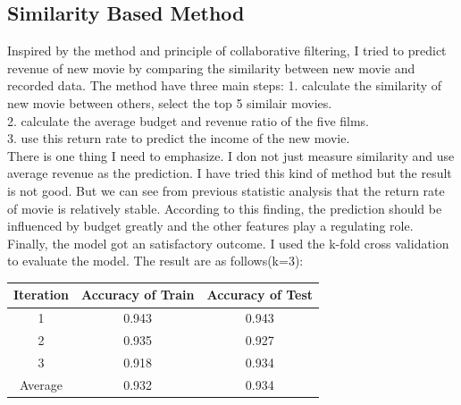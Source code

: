 \documentclass[UTF8]{article}
\begin{document}
\subsection{Similarity Based Method}
Inspired by the method and principle of collaborative filtering, I tried to predict revenue of new movie
by comparing the similarity between new movie and recorded data. The method have three main steps:
1. calculate the similarity of new movie between others, select the top 5 similair movies. \\
2. calculate the average budget and revenue ratio of the five films.\\
3. use this return rate to predict the income of the new movie.\\
There is one thing I need to emphasize. I don not just measure similarity and use average revenue
as the prediction. I have tried this kind of method but the result is not good. But we can see from
previous statistic analysis that the return rate of movie is relatively stable. According to this finding,
the prediction should be influenced by budget greatly and the other features play a regulating role.
Finally, the model got an satisfactory outcome. I used the k-fold cross validation to evaluate the model.
The result are as follows(k=3):
\begin{center}
    \begin{tabular}{|c|c|c|}
        \hline
        Iteration & Accuracy of Train & Accuracy of Test \\
        \hline
        1         & 0.943             & 0.943            \\
        \hline
        2         & 0.935             & 0.927            \\
        \hline
        3         & 0.918             & 0.934            \\
        \hline
        Average   & 0.932             & 0.934            \\
        \hline
    \end{tabular}
\end{center}
\end{document}
